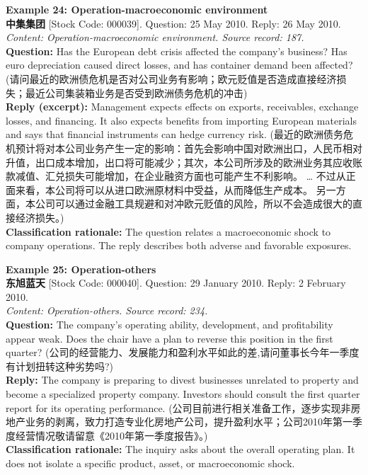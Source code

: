 \clearpage
\noindent \textbf{Example 24: Operation-macroeconomic environment} \\
\textbf{中集集团} [Stock Code: 000039]. Question: 25 May 2010. Reply: 26 May 2010. \\
\textit{Content: Operation-macroeconomic environment. Source record: 187.} \\
\textbf{Question:} Has the European debt crisis affected the company's business? Has euro depreciation caused direct losses, and has container demand been affected? (请问最近的欧洲债危机是否对公司业务有影响；欧元贬值是否造成直接经济损失；最近公司集装箱业务是否受到欧洲债务危机的冲击) \\
\textbf{Reply (excerpt):} Management expects effects on exports, receivables, exchange losses, and financing. It also expects benefits from importing European materials and says that financial instruments can hedge currency risk. (最近的欧洲债务危机预计将对本公司业务产生一定的影响：首先会影响中国对欧洲出口，人民币相对升值，出口成本增加，出口将可能减少；其次，本公司所涉及的欧洲业务其应收账款减值、汇兑损失可能增加，在企业融资方面也可能产生不利影响。 \ldots{} 不过从正面来看，本公司将可以从进口欧洲原材料中受益，从而降低生产成本。 另一方面，本公司可以通过金融工具规避和对冲欧元贬值的风险，所以不会造成很大的直接经济损失。) \\
\textbf{Classification rationale:} The question relates a macroeconomic shock to company operations. The reply describes both adverse and favorable exposures.

\vspace{0.4cm}
\noindent \textbf{Example 25: Operation-others} \\
\textbf{东旭蓝天} [Stock Code: 000040]. Question: 29 January 2010. Reply: 2 February 2010. \\
\textit{Content: Operation-others. Source record: 234.} \\
\textbf{Question:} The company's operating ability, development, and profitability appear weak. Does the chair have a plan to reverse this position in the first quarter? (公司的经营能力、发展能力和盈利水平如此的差,请问董事长今年一季度有计划扭转这种劣势吗?) \\
\textbf{Reply:} The company is preparing to divest businesses unrelated to property and become a specialized property company. Investors should consult the first quarter report for its operating performance. (公司目前进行相关准备工作，逐步实现非房地产业务的剥离，致力打造专业化房地产公司，提升盈利水平；公司2010年第一季度经营情况敬请留意《2010年第一季度报告》。) \\
\textbf{Classification rationale:} The inquiry asks about the overall operating plan. It does not isolate a specific product, asset, or macroeconomic shock.

